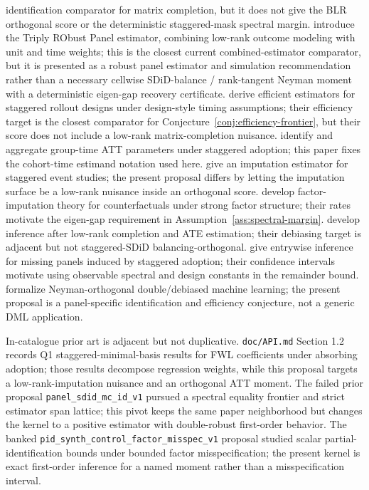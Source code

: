 \documentclass[11pt]{article}
\theoremstyle{definition}
\theoremstyle{plain}
\theoremstyle{remark}
\begin{document}
identification comparator for matrix completion, but it does not give the BLR
orthogonal score or the deterministic staggered-mask spectral margin.
\citet{AtheyImbensQuViviano2025} introduce the Triply RObust Panel estimator,
combining low-rank outcome modeling with unit and time weights; this is the
closest current combined-estimator comparator, but it is presented as a robust
panel estimator and simulation recommendation rather than a necessary
cellwise SDiD-balance / rank-tangent Neyman moment with a deterministic
eigen-gap recovery certificate.
\citet{RothSantAnna2021} derive efficient estimators for staggered rollout
designs under design-style timing assumptions; their efficiency target is the
closest comparator for Conjecture~\ref{conj:efficiency-frontier}, but their
score does not include a low-rank matrix-completion nuisance.
\citet{CallawaySantAnna2021} identify and aggregate group-time ATT parameters
under staggered adoption; this paper fixes the cohort-time estimand notation
used here.
\citet{BorusyakJaravelSpiess2024} give an imputation estimator for staggered
event studies; the present proposal differs by letting the imputation surface
be a low-rank nuisance inside an orthogonal score.
\citet{BaiNg2021} develop factor-imputation theory for counterfactuals under
strong factor structure; their rates motivate the eigen-gap requirement in
Assumption~\ref{ass:spectral-margin}.
\citet{ChoiKwonLiao2024} develop inference after low-rank completion and ATE
estimation; their debiasing target is adjacent but not staggered-SDiD
balancing-orthogonal.
\citet{YanWainwright2024} give entrywise inference for missing panels induced
by staggered adoption; their confidence intervals motivate using observable
spectral and design constants in the remainder bound.
\citet{ChernozhukovChetverikovDemirerDufloHansenNeweyRobins2018} formalize
Neyman-orthogonal double/debiased machine learning; the present proposal is a
panel-specific identification and efficiency conjecture, not a generic DML
application.

In-catalogue prior art is adjacent but not duplicative. \texttt{doc/API.md}
Section 1.2 records Q1 staggered-minimal-basis results for FWL coefficients
under absorbing adoption; those results decompose regression weights, while
this proposal targets a low-rank-imputation nuisance and an orthogonal ATT
moment. The failed prior proposal \texttt{panel\_sdid\_mc\_id\_v1} pursued a
spectral equality frontier and strict estimator span lattice; this pivot keeps
the same paper neighborhood but changes the kernel to a positive estimator
with double-robust first-order behavior. The banked
\texttt{pid\_synth\_control\_factor\_misspec\_v1} proposal studied scalar
partial-identification bounds under bounded factor misspecification; the
present kernel is exact first-order inference for a named moment rather than a
misspecification interval.
\end{document}
